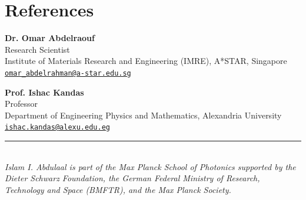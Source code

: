\documentclass[11pt,a4paper]{article}
\begin{document}
\section*{References}
\noindent
\begin{minipage}[t]{0.48\textwidth}
\textbf{Dr. Omar Abdelraouf} \\
Research Scientist \\
Institute of Materials Research and Engineering (IMRE), A*STAR, Singapore \\
 \href{mailto:omar_abdelrahman@a-star.edu.sg}{\nolinkurl{omar_abdelrahman@a-star.edu.sg}}
\end{minipage}%
\hfill
\begin{minipage}[t]{0.48\textwidth}
\textbf{Prof. Ishac Kandas} \\
Professor \\
Department of Engineering Physics and Mathematics, Alexandria University \\
 \href{mailto:ishac.kandas@alexu.edu.eg}{\nolinkurl{ishac.kandas@alexu.edu.eg}}
\end{minipage}

\vspace{8pt}
\noindent\rule{\textwidth}{0.4pt}\\[3pt]
{\small\textit{Islam I. Abdulaal is part of the Max Planck School of Photonics supported by the Dieter Schwarz Foundation, the German Federal Ministry of Research, Technology and Space (BMFTR), and the Max Planck Society.}}
\end{document}
